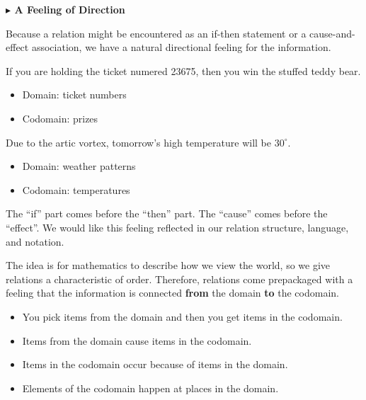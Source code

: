 \documentclass{ximera}
\begin{document}
\textbf{\textcolor{red!80!black}{$\blacktriangleright$ A Feeling of Direction}}



Because a relation might be encountered as an if-then statement or a cause-and-effect association, we have a natural directional feeling for the information.  



\begin{idea}
If you are holding the ticket numered 23675, then you win the stuffed teddy bear. \\

\begin{itemize}
    \item Domain: ticket numbers
    \item Codomain: prizes
\end{itemize}

\end{idea}



\begin{idea}
Due to the artic vortex, tomorrow's high temperature will be $30^{\circ}$. \\

\begin{itemize}
    \item Domain: weather patterns
    \item Codomain: temperatures
\end{itemize}

\end{idea}

The ``if'' part comes before the ``then'' part.  The ``cause'' comes before the ``effect''.  We would like this feeling reflected in our relation structure, language, and notation.  


The idea is for mathematics to describe how we view the world, so we give relations a characteristic of order. Therefore, relations come prepackaged with a feeling that the information is connected \textbf{\textcolor{purple!85!blue}{from}} the domain \textbf{\textcolor{purple!85!blue}{to}} the codomain.






\begin{itemize}
\item You pick items from the domain and then you get items in the codomain.
\item Items from the domain cause items in the codomain.
\item Items in the codomain occur because of items in the domain.
\item Elements of the codomain happen at places in the domain.
\end{itemize}
\end{document}

